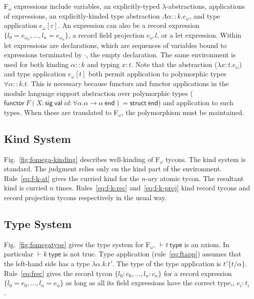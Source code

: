 F$_\omega$ expressions include variables, an explicitly-typed
$\lambda$-abstractions, applications of expressions, an explicitly-kinded type
abstraction $\Lambda\alpha::k.e_\omega$, and type application
$e_\omega[c]$. An expression can also be a record expression
$\{l_0=e_{\omega_0},\ldots,l_n=e_{\omega_n}\}$, a record field
projection $e_\omega.l$, or a let expression. Within let expressions
are declarations, which are sequences of variables bound to
expressions terminated by $\cdot$, the empty declaration. The same
environment is used for both kinding $\alpha::k$ and typing $x:t$. Note that the
abstraction ($\lambda x:t.e_\omega$) and type application
$e_{\omega}[t]$ both permit application to polymorphic types
$\forall\alpha::k.t$. This is necessary because functors and
functor applications in the module language support abstraction over
polymorphic types ($\mathsf{functor}~F(X:\mathsf{sig~val}~id :
\forall\alpha.\alpha\to\alpha~\mathsf{end})=\mathsf{struct~end}$) and
application to such types. When these are translated to F$_\omega$,
the polymorphism must be maintained. 

\subsection{Kind System}


Fig.~\ref{fig:fomega-kinding} describes well-kinding of F$_\omega$
tycons. The kind system is standard. The judgment relies only on the
kind part of the environment. Rule~\ref{eq:f-k-at} gives the curried
kind for the $n$-ary atomic tycon. The resultant kind is curried $n$
times.  Rules~\ref{eq:f-k-rec}
and~\ref{eq:f-k-proj} kind record tycons and record projection tycons
respectively in the usual way. 

\subsection{Type System}


Fig.~\ref{fig:fomegatype} gives the type system for
F$_\omega$. $\vdash t~\mathsf{type}$ is an axiom. In particular
$\vdash k~\mathsf{type}$ is not true. Type application
(rule~\ref{eq:ftapp}) assumes that the left-hand side has a type
$\lambda\alpha.k.t'$. The type of the type application is
$t'\{t/\alpha\}$. Rule~\ref{eq:frec} gives the record tycon
$\{l_0:c_0,\ldots,l_n:c_n\}$ for a
record expression $\{l_0=e_0, \ldots, l_n=e_n\}$ as long as all its
field expressions have the correct type,\ie, $e_i : t_i$. 

